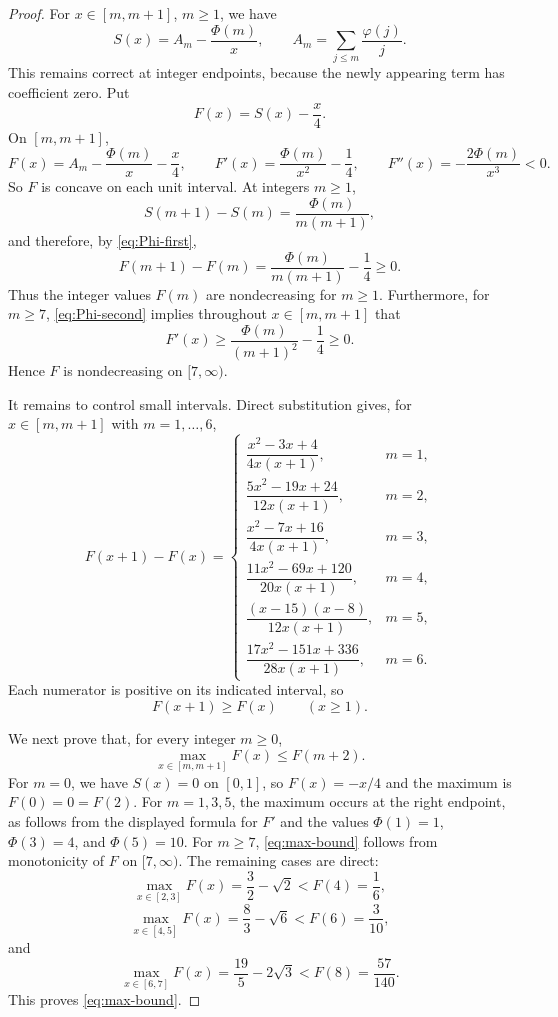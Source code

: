 \documentclass[10pt,a4paper]{amsart}
\begin{document}
\begin{proof}
For $x\in[m,m+1]$, $m\ge1$, we have
\[
  S(x)=A_m-\frac{\Phi(m)}x,
  \qquad A_m=\sum_{j\le m}\frac{\varphi(j)}j.
\]
This remains correct at integer endpoints, because the newly appearing term has coefficient zero.  Put
\[
  F(x)=S(x)-\frac x4.
\]
On $[m,m+1]$,
\[
  F(x)=A_m-\frac{\Phi(m)}x-\frac x4,
  \qquad
  F'(x)=\frac{\Phi(m)}{x^2}-\frac14,
  \qquad
  F''(x)=-\frac{2\Phi(m)}{x^3}<0.
\]
So $F$ is concave on each unit interval.  At integers $m\ge1$,
\[
  S(m+1)-S(m)=\frac{\Phi(m)}{m(m+1)},
\]
and therefore, by \eqref{eq:Phi-first},
\[
  F(m+1)-F(m)=\frac{\Phi(m)}{m(m+1)}-\frac14\ge0.
\]
Thus the integer values $F(m)$ are nondecreasing for $m\ge1$.  Furthermore, for $m\ge7$, \eqref{eq:Phi-second} implies throughout $x\in[m,m+1]$ that
\[
  F'(x)\ge \frac{\Phi(m)}{(m+1)^2}-\frac14\ge0.
\]
Hence $F$ is nondecreasing on $[7,\infty)$.

It remains to control small intervals.  Direct substitution gives, for $x\in[m,m+1]$ with $m=1,\ldots,6$,
\[
F(x+1)-F(x)=
\begin{cases}
\dfrac{x^2-3x+4}{4x(x+1)}, & m=1,\\[1.2ex]
\dfrac{5x^2-19x+24}{12x(x+1)}, & m=2,\\[1.2ex]
\dfrac{x^2-7x+16}{4x(x+1)}, & m=3,\\[1.2ex]
\dfrac{11x^2-69x+120}{20x(x+1)}, & m=4,\\[1.2ex]
\dfrac{(x-15)(x-8)}{12x(x+1)}, & m=5,\\[1.2ex]
\dfrac{17x^2-151x+336}{28x(x+1)}, & m=6.
\end{cases}
\]
Each numerator is positive on its indicated interval, so
\begin{equation}\label{eq:F-shift}
  F(x+1)\ge F(x)\qquad(x\ge1).
\end{equation}

We next prove that, for every integer $m\ge0$,
\begin{equation}\label{eq:max-bound}
  \max_{x\in[m,m+1]}F(x)\le F(m+2).
\end{equation}
For $m=0$, we have $S(x)=0$ on $[0,1]$, so $F(x)=-x/4$ and the maximum is $F(0)=0=F(2)$.  For $m=1,3,5$, the maximum occurs at the right endpoint, as follows from the displayed formula for $F'$ and the values $\Phi(1)=1$, $\Phi(3)=4$, and $\Phi(5)=10$.  For $m\ge7$, \eqref{eq:max-bound} follows from monotonicity of $F$ on $[7,\infty)$.  The remaining cases are direct:
\[
  \max_{x\in[2,3]}F(x)=\frac32-\sqrt2<F(4)=\frac16,
\]
\[
  \max_{x\in[4,5]}F(x)=\frac83-\sqrt6<F(6)=\frac3{10},
\]
and
\[
  \max_{x\in[6,7]}F(x)=\frac{19}{5}-2\sqrt3<F(8)=\frac{57}{140}.
\]
This proves \eqref{eq:max-bound}.


\end{proof}
\end{document}
